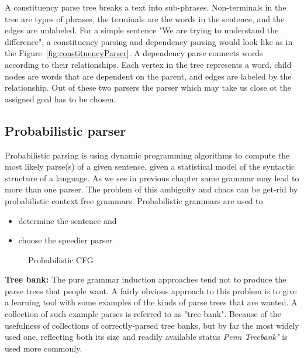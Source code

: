 \documentclass{bmcart}
\begin{document}
A constituency parse tree breaks a text into sub-phrases. Non-terminals in the tree are types of phrases, the terminals are the words in the sentence, and the edges are unlabeled. For a simple sentence "We are trying to understand the difference", a constituency parsing and dependency parsing would look like as in the Figure~\ref{fig:constituencyParser}. A dependency parse connects words according to their relationships. Each vertex in the tree represents a word, child nodes are words that are dependent on the parent, and edges are labeled by the relationship. Out of these two parsers the parser which may take us close ot the assigned goal has to be chosen.

\subsection{Probabilistic parser}
\label{ssec:probParsing}
Probabilistic parsing is using dynamic programming algorithms to compute the most likely parse(s) of a given sentence, given a statistical model of the syntactic structure of a language. As we see in previous chapter same grammar may lead to more than one parser. The problem of this ambiguity and chaos can be get-rid by probabilistic context free grammars. Probabilistic grammars are used to
\begin{itemize}
\item determine the sentence and 
\item choose the speedier parser
\end{itemize}

\hspace{-5mm}
\begin{figure}
\begin{minipage}{0.45\textwidth}
\centering
{}
\end{minipage}%
\begin{minipage}{0.45\textwidth}
\centering
{}
\end{minipage}
\caption{Probabilistic CFG}
\end{figure}


{\bf Tree bank:} The pure grammar induction approaches tend not to produce the parse trees that people want. A fairly obvious approach to this problem is to give a learning tool with some examples of the kinds of parse trees that are wanted. A collection of such example parses is referred to as "tree bank". Because of the usefulness of collections of correctly-parsed tree banks, but by far the most widely used one, reflecting both its size and readily  available status {\it Penn Treebank"} is used more commonly.
\end{document}
